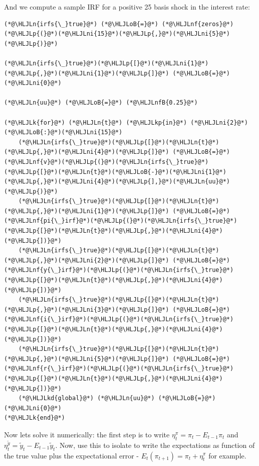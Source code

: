 \documentclass[12pt,a4paper]{article}
\newcommand{\HLJLk}[1]{\textcolor[RGB]{148,91,176}{\textbf{#1}}}
\newcommand{\HLJLkd}[1]{\textcolor[RGB]{214,102,97}{\textit{#1}}}
\newcommand{\HLJLkp}[1]{\textcolor[RGB]{148,91,176}{\textbf{#1}}}
\newcommand{\HLJLn}[1]{#1}
\newcommand{\HLJLnf}[1]{\textcolor[RGB]{66,102,213}{#1}}
\newcommand{\HLJLnfB}[1]{\textcolor[RGB]{59,151,46}{#1}}
\newcommand{\HLJLni}[1]{\textcolor[RGB]{59,151,46}{#1}}
\newcommand{\HLJLoB}[1]{\textcolor[RGB]{102,102,102}{\textbf{#1}}}
\newcommand{\HLJLp}[1]{#1}
\begin{document}
And we compute a sample IRF for a positive 25 basis shock in the interest rate:


\begin{lstlisting}
(*@\HLJLn{irfs{\_}true}@*) (*@\HLJLoB{=}@*) (*@\HLJLnf{zeros}@*)(*@\HLJLp{(}@*)(*@\HLJLni{15}@*)(*@\HLJLp{,}@*)(*@\HLJLni{5}@*)(*@\HLJLp{)}@*)

(*@\HLJLn{irfs{\_}true}@*)(*@\HLJLp{[}@*)(*@\HLJLni{1}@*)(*@\HLJLp{,}@*)(*@\HLJLni{1}@*)(*@\HLJLp{]}@*) (*@\HLJLoB{=}@*) (*@\HLJLni{0}@*)

(*@\HLJLn{uu}@*) (*@\HLJLoB{=}@*) (*@\HLJLnfB{0.25}@*)

(*@\HLJLk{for}@*) (*@\HLJLn{t}@*) (*@\HLJLkp{in}@*) (*@\HLJLni{2}@*)(*@\HLJLoB{:}@*)(*@\HLJLni{15}@*)
    (*@\HLJLn{irfs{\_}true}@*)(*@\HLJLp{[}@*)(*@\HLJLn{t}@*)(*@\HLJLp{,}@*)(*@\HLJLni{4}@*)(*@\HLJLp{]}@*) (*@\HLJLoB{=}@*) (*@\HLJLnf{v}@*)(*@\HLJLp{(}@*)(*@\HLJLn{irfs{\_}true}@*)(*@\HLJLp{[}@*)(*@\HLJLn{t}@*)(*@\HLJLoB{-}@*)(*@\HLJLni{1}@*)(*@\HLJLp{,}@*)(*@\HLJLni{4}@*)(*@\HLJLp{],}@*)(*@\HLJLn{uu}@*)(*@\HLJLp{)}@*)
    (*@\HLJLn{irfs{\_}true}@*)(*@\HLJLp{[}@*)(*@\HLJLn{t}@*)(*@\HLJLp{,}@*)(*@\HLJLni{1}@*)(*@\HLJLp{]}@*) (*@\HLJLoB{=}@*) (*@\HLJLnf{pi{\_}irf}@*)(*@\HLJLp{(}@*)(*@\HLJLn{irfs{\_}true}@*)(*@\HLJLp{[}@*)(*@\HLJLn{t}@*)(*@\HLJLp{,}@*)(*@\HLJLni{4}@*)(*@\HLJLp{])}@*)
    (*@\HLJLn{irfs{\_}true}@*)(*@\HLJLp{[}@*)(*@\HLJLn{t}@*)(*@\HLJLp{,}@*)(*@\HLJLni{2}@*)(*@\HLJLp{]}@*) (*@\HLJLoB{=}@*) (*@\HLJLnf{y{\_}irf}@*)(*@\HLJLp{(}@*)(*@\HLJLn{irfs{\_}true}@*)(*@\HLJLp{[}@*)(*@\HLJLn{t}@*)(*@\HLJLp{,}@*)(*@\HLJLni{4}@*)(*@\HLJLp{])}@*)
    (*@\HLJLn{irfs{\_}true}@*)(*@\HLJLp{[}@*)(*@\HLJLn{t}@*)(*@\HLJLp{,}@*)(*@\HLJLni{3}@*)(*@\HLJLp{]}@*) (*@\HLJLoB{=}@*) (*@\HLJLnf{i{\_}irf}@*)(*@\HLJLp{(}@*)(*@\HLJLn{irfs{\_}true}@*)(*@\HLJLp{[}@*)(*@\HLJLn{t}@*)(*@\HLJLp{,}@*)(*@\HLJLni{4}@*)(*@\HLJLp{])}@*)
    (*@\HLJLn{irfs{\_}true}@*)(*@\HLJLp{[}@*)(*@\HLJLn{t}@*)(*@\HLJLp{,}@*)(*@\HLJLni{5}@*)(*@\HLJLp{]}@*) (*@\HLJLoB{=}@*) (*@\HLJLnf{r{\_}irf}@*)(*@\HLJLp{(}@*)(*@\HLJLn{irfs{\_}true}@*)(*@\HLJLp{[}@*)(*@\HLJLn{t}@*)(*@\HLJLp{,}@*)(*@\HLJLni{4}@*)(*@\HLJLp{])}@*)
    (*@\HLJLkd{global}@*) (*@\HLJLn{uu}@*) (*@\HLJLoB{=}@*) (*@\HLJLni{0}@*)
(*@\HLJLk{end}@*)
\end{lstlisting}


Now lets solve it numerically: the first step is to write $\eta_t^{\pi} = \pi_t - E_{t-1} \pi_t$ and $\eta_t^{\tilde{y}} = \tilde{y}_t - E_{t-1} \tilde{y}_t$. Now, use this to isolate to write the expectations as function of the true value plus the expectational error - $E_t(\pi_{t+1}) = \pi_t + \eta_t^{\pi}$ for example.
\end{document}
